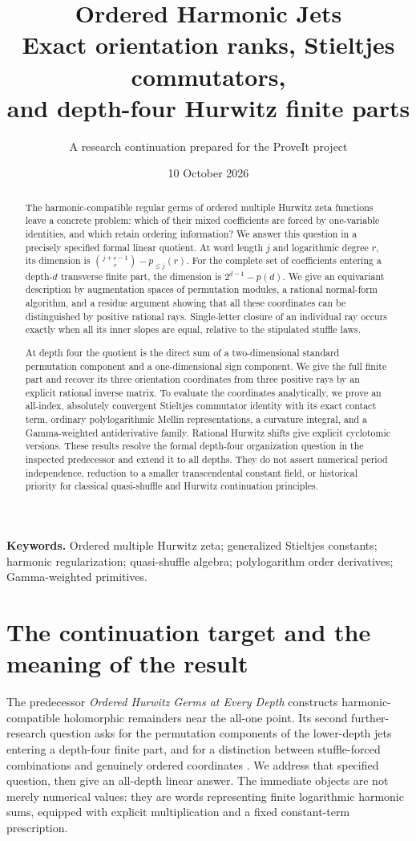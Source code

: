 \documentclass[11pt]{article}
\title{\textbf{Ordered Harmonic Jets}\\[5pt]
\large Exact orientation ranks, Stieltjes commutators,\\
and depth-four Hurwitz finite parts}
\author{A research continuation prepared for the ProveIt project}
\date{10 October 2026}
\numberwithin{equation}{section}
\theoremstyle{definition}
\begin{document}
\maketitle
\begin{abstract}
The harmonic-compatible regular germs of ordered multiple Hurwitz zeta
functions leave a concrete problem: which of their mixed coefficients are
forced by one-variable identities, and which retain ordering information?
We answer this question in a precisely specified formal linear quotient.
At word length $j$ and logarithmic degree $r$, its dimension is
$\binom{j+r-1}{r}-p_{\le j}(r)$. For the complete set of coefficients entering
a depth-$d$ transverse finite part, the dimension is
$2^{d-1}-p(d)$. We give an equivariant description by augmentation spaces
of permutation modules, a rational normal-form algorithm, and a residue
argument showing that all these coordinates can be distinguished by
positive rational rays. Single-letter closure of an individual ray occurs
exactly when all its inner slopes are equal, relative to the stipulated
stuffle laws.

At depth four the quotient is the direct sum of a two-dimensional
standard permutation component and a one-dimensional sign component.
We give the full finite part and recover its three orientation coordinates
from three positive rays by an explicit rational inverse matrix. To evaluate
the coordinates analytically, we prove an all-index, absolutely convergent
Stieltjes commutator identity with its exact contact term, ordinary
polylogarithmic Mellin representations, a curvature integral, and a
Gamma-weighted antiderivative family. Rational Hurwitz shifts give explicit
cyclotomic versions. These results resolve the formal depth-four
organization question in the inspected predecessor and extend it to all
depths. They do not assert numerical period independence, reduction to a
smaller transcendental constant field, or historical priority for classical
quasi-shuffle and Hurwitz continuation principles.
\end{abstract}
\vspace{6pt}
\noindent\textbf{Keywords.} Ordered multiple Hurwitz zeta; generalized Stieltjes
constants; harmonic regularization; quasi-shuffle algebra; polylogarithm
order derivatives; Gamma-weighted primitives.
\clearpage
\tableofcontents
\clearpage

\section{The continuation target and the meaning of the result}
\label{sec:scope}
The predecessor \emph{Ordered Hurwitz Germs at Every Depth} constructs
harmonic-compatible holomorphic remainders near the all-one point. Its
second further-research question asks for the permutation components of
the lower-depth jets entering a depth-four finite part, and for a distinction
between stuffle-forced combinations and genuinely ordered coordinates
\cite{ordered}. We address that specified question, then give an all-depth
linear answer. The immediate objects are not merely numerical values: they
are words representing finite logarithmic harmonic sums, equipped with
explicit multiplication and a fixed constant-term prescription.
\end{document}

